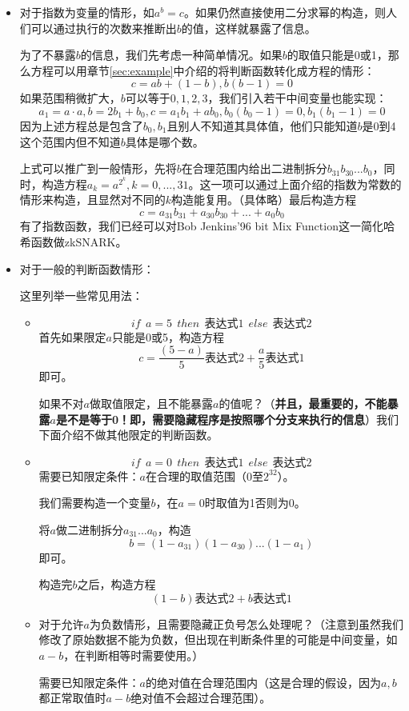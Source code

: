 \documentclass[12pt]{article}
\newcommand{\zk}{zkSNARK}
\begin{document}
\begin{itemize}
	\item 对于指数为变量的情形，如$a^b=c$。如果仍然直接使用二分求幂的构造，则人们可以通过执行的次数来推断出$b$的值，这样就暴露了信息。

	为了不暴露$b$的信息，我们先考虑一种简单情况。如果$b$的取值只能是0或1，那么方程可以用章节\ref{sec:example}中介绍的将判断函数转化成方程的情形：
	$$ c= ab+(1-b), b(b-1) = 0$$
	如果范围稍微扩大，$b$可以等于$0,1,2,3$，我们引入若干中间变量也能实现：
	$$a_1=a\cdot a, b=2b_1+b_0, c=a_1b_1+ab_0, b_0(b_0-1)=0, b_1(b_1-1)=0$$
	因为上述方程总是包含了$b_0,b_1$且别人不知道其具体值，他们只能知道$b$是0到4这个范围内但不知道$b$具体是哪个数。

	上式可以推广到一般情形，先将$b$在合理范围内给出二进制拆分$b_{31}b_{30}...b_0$，同时，构造方程$a_k=a^{2^k},k=0,...,31$。这一项可以通过上面介绍的指数为常数的情形来构造，且显然对不同的$k$构造能复用。（具体略）最后构造方程
	$$c= a_{31}b_{31}+a_{30}b_{30}+...+a_0b_0$$
	有了指数函数，我们已经可以对Bob Jenkins'96 bit Mix Function这一简化哈希函数做\zk。
	\item 对于一般的判断函数情形：

	这里列举一些常见用法：
	\begin{itemize}
    \item	$$if~~a=5~~then~~\mbox{表达式1}~~else~~\mbox{表达式2}$$
     首先如果限定$a$只能是0或5，构造方程 $$c=\frac{(5-a)}{5}\mbox{表达式2}+\frac{a}{5}\mbox{表达式1}$$即可。

     如果不对$a$做取值限定，且不能暴露$a$的值呢？（\textbf{并且，最重要的，不能暴露$a$是不是等于0！即，需要隐藏程序是按照哪个分支来执行的信息}）我们下面介绍不做其他限定的判断函数。
     \item $$if~~a=0~~then~~\mbox{表达式1}~~else~~\mbox{表达式2}$$
     需要已知限定条件：$a$在合理的取值范围（$0$至$2^{32}$）。

     我们需要构造一个变量$b$，在$a = 0$时取值为1否则为0。

     将$a$做二进制拆分$a_{31}...a_0$，构造
     $$b=(1-a_{31})(1-a_{30})...(1-a_1)$$即可。

     构造完$b$之后，构造方程$$(1-b)\mbox{表达式2}+b\mbox{表达式1}$$

     \item 对于允许$a$为负数情形，且需要隐藏正负号怎么处理呢？（注意到虽然我们修改了原始数据不能为负数，但出现在判断条件里的可能是中间变量，如$a-b$，在判断相等时需要使用。）

     需要已知限定条件：$a$的绝对值在合理范围内（这是合理的假设，因为$a,b$都正常取值时$a-b$绝对值不会超过合理范围）。


\end{itemize}
\end{itemize}
\end{document}
